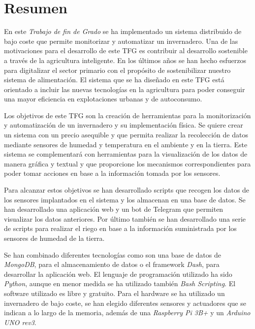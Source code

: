 \documentclass[a4paper, 12pt, oneside]{book}
\begin{document}

\chapter*{Resumen}
En este \textit{Trabajo de fin de Grado} se ha implementado un sistema distribuido de bajo coste que permite monitorizar y automatizar un invernadero. Una de las motivaciones para el desarrollo de este TFG es contribuir al desarrollo sostenible a través de la agricultura inteligente. En los últimos años se han hecho esfuerzos para digitalizar el sector primario con el propósito de sostenibilizar nuestro sistema de alimentación. El sistema que se ha diseñado en este TFG está orientado a incluir las nuevas tecnologías en la agricultura para poder conseguir una mayor eficiencia en explotaciones urbanas y de autoconsumo.

Los objetivos de este TFG son la creación de herramientas para la monitorización y automatización de un invernadero y su implementación física. Se quiere crear un sistema con un precio asequible y que permita realizar la recolección de datos mediante sensores de humedad y temperatura en el ambiente y en la tierra. Este sistema se complementará con herramientas para la visualización de los datos de manera gráfica y textual y que proporcione los mecanismos correspondientes para poder tomar acciones en base a la información tomada por los sensores.

Para alcanzar estos objetivos se han desarrollado scripts que recogen los datos de los sensores implantados en el sistema y los almacenan en una base de datos. Se han desarrollado una aplicación web y un bot de Telegram que permiten visualizar los datos anteriores. Por último también se han desarrollado una serie de scripts para realizar el riego en base a la información suministrada por los sensores de humedad de la tierra.

Se han combinado diferentes tecnologías como son una base de datos de \textit{MongoDB}, para el almacenamiento de datos o el framework \textit{Dash}, para desarrollar la aplicación web.
El lenguaje de programación utilizado ha sido \textit{Python}, aunque en menor medida se ha utilizado también \textit{Bash Scripting}. El software utilizado es libre y gratuito. Para el hardware se ha utilizado un invernadero de bajo coste, se han elegido diferentes sensores y actuadores que se indican a lo largo de la memoria, además de una \textit{Raspberry Pi 3B+} y un \textit{Arduino UNO rev3}.
\end{document}
